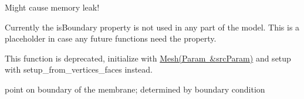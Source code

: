 
\begin{DoxyRefList}
\item[Member \mbox{\hyperlink{Linear__algebra_8hpp_a476d951514d654f916418cee7d5b189f}{kron}} (const \mbox{\hyperlink{classMatrix}{Matrix}} \&v1, const \mbox{\hyperlink{classMatrix}{Matrix}} \&v2)]\label{deprecated__deprecated000002}%
%
Might cause memory leak!  
\item[Member \mbox{\hyperlink{classMesh_aef5bfdb2d69c0d217dff5b1fd83ed0f5}{Mesh\+::determine\+\_\+boundary\+\_\+vertices\+\_\+faces}} ()]\label{deprecated__deprecated000004}%
%
Currently the is\+Boundary property is not used in any part of the model. This is a placeholder in case any future functions need the property.  
\item[Member \mbox{\hyperlink{classMesh_aaab78f3a30742a937d9a387287ce323c}{Mesh\+::Mesh}} (const std\+::vector$<$ Vertex $>$ \&src\+Vertices, const std\+::vector$<$ Face $>$ \&src\+Faces, \mbox{\hyperlink{structParam}{Param}} \&src\+Param) \+\_\+\+\_\+attribute\+\_\+\+\_\+((deprecated(\char`\"{}\+Initialize with Mesh(\+Param \&src\+Param) and setup with setup\+\_\+from\+\_\+vertices\+\_\+faces instead.\char`\"{})))]\label{deprecated__deprecated000003}%
%
This function is deprecated, initialize with \mbox{\hyperlink{classMesh_a0685f9dfb74d633c092886d56afffb6e}{Mesh(\+Param \&src\+Param)}} and setup with setup\+\_\+from\+\_\+vertices\+\_\+faces instead.  
\item[Member \mbox{\hyperlink{classVertex_a750a2c4ba0ecccad4a94fea85624330b}{Vertex\+::is\+Boundary}} ]\label{deprecated__deprecated000005}%
%
 point on boundary of the membrane; determined by boundary condition 
\end{DoxyRefList}